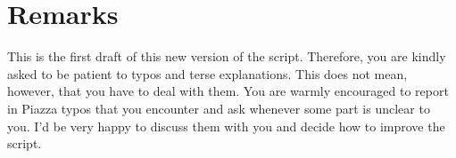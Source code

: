 \section*{Remarks}

This is the first draft of this new version of the script. Therefore, you
are kindly asked to be patient to typos and terse explanations. This does
not mean, however, that you have to deal with them. You are warmly
encouraged to report in Piazza typos that you encounter and ask whenever
some part is unclear to you. I'd be very happy to discuss them with you
and decide how to improve the script.